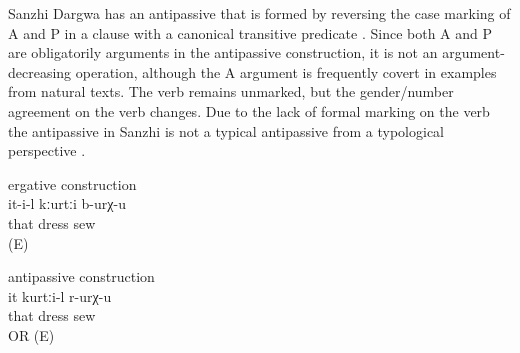 Sanzhi Dargwa has an antipassive that is formed by reversing the case marking of A and P in a clause with a canonical transitive predicate . Since both A and P are obligatorily arguments in the antipassive construction, it is not an argument-decreasing operation, although the A argument is frequently covert in examples from natural texts. The verb remains unmarked, but the gender/number agreement on the verb changes. Due to the lack of formal marking on the verb the antipassive in Sanzhi is not a typical antipassive from a typological perspective \citep{Polinsky2005}. 
%
\begin{exe}

		\ex	ergative construction \label{ex:S/he sews a dress@63a}\\
		\gll	it-i-l	kːurtːi	b-urχ-u\\
			that	dress	sew\\
		\glt	{} (E) 

		\ex	antipassive construction \label{ex:She is a dressmaker@63b}\\
		\gll	it	kurtːi-l	r-urχ-u \\
			that	dress	sew\\
		\glt	{} OR  (E)

\end{exe}

